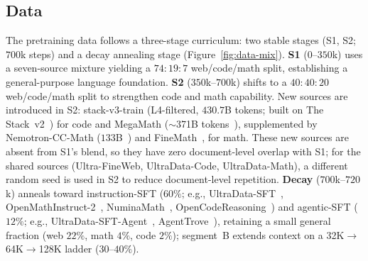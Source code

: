 \subsection{Data}\label{sec:llm-data}
The pretraining data follows a three-stage curriculum: two stable stages (S1, S2; $700$k steps) and a decay annealing stage (Figure~\ref{fig:data-mix}).
\textbf{S1} ($0$--$350$k) uses a seven-source mixture yielding a $74{:}19{:}7$ web/code/math split, establishing a general-purpose language foundation.
\textbf{S2} ($350$k--$700$k) shifts to a $40{:}40{:}20$ web/code/math split to strengthen code and math capability.
New sources are introduced in S2: stack-v3-train (L4-filtered, $430.7$B tokens; built on The Stack~v2~\cite{lozhkov2024stackv2}) for code and MegaMath ($\sim$371B tokens~\cite{liu2025megamath}), supplemented by Nemotron-CC-Math ($133$B~\cite{mahabadi2026nemotronccmath}) and FineMath~\cite{benallal2025smolm2}, for math.
These new sources are absent from S1's blend, so they have zero document-level overlap with S1; for the shared sources (Ultra-FineWeb, UltraData-Code, UltraData-Math), a different random seed is used in S2 to reduce document-level repetition.
\textbf{Decay} ($700$k--$720$k) anneals toward instruction-SFT ($60\%$; e.g., UltraData-SFT~\cite{openbmb2026ultradata}, OpenMathInstruct-2~\cite{toshniwal2024openmathinstruct2}, NuminaMath~\cite{li2024numinamath}, OpenCodeReasoning~\cite{ahmad2025opencodereasoning}) and agentic-SFT ($12\%$; e.g., UltraData-SFT-Agent~\cite{openbmb2026ultradata}, AgentTrove~\cite{openthoughts2026agenttrove}), retaining a small general fraction (web $22\%$, math $4\%$, code $2\%$); segment~B extends context on a \mbox{32K$\to$64K$\to$128K} ladder ($30$--$40\%$).
